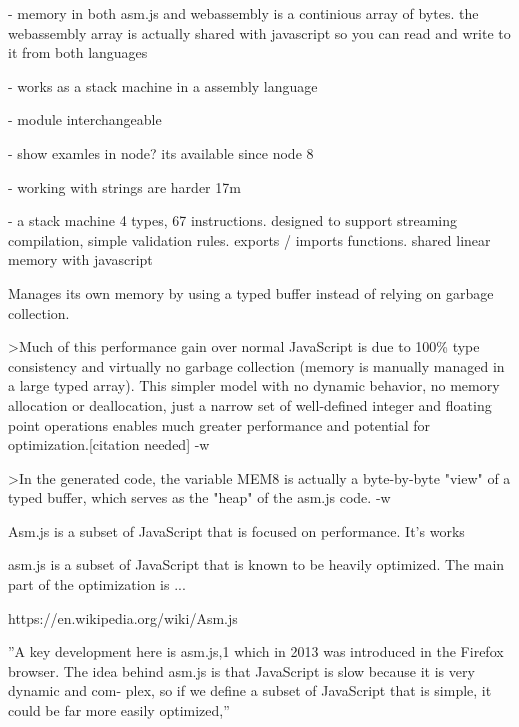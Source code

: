 - memory in both asm.js and webassembly is a continious array of bytes. the webassembly array is actually shared with javascript so you can read and write to it from both languages

- works as a stack machine in a assembly language

- module interchangeable

- show examles in node? its available since node 8

- working with strings are harder 17m


- a stack machine 4 types, 67 instructions. designed to support streaming compilation, simple validation rules. exports / imports functions. shared linear memory with javascript



Manages its own memory by using a typed buffer instead of relying on garbage collection.

>Much of this performance gain over normal JavaScript is due to 100\% type consistency and virtually no garbage collection (memory is manually managed in a large typed array). This simpler model with no dynamic behavior, no memory allocation or deallocation, just a narrow set of well-defined integer and floating point operations enables much greater performance and potential for optimization.[citation needed] -w

>In the generated code, the variable MEM8 is actually a byte-by-byte "view" of a typed buffer, which serves as the "heap" of the asm.js code. -w





Asm.js is a subset of JavaScript that is focused on performance. It's works 

asm.js is a subset of JavaScript that is known to be heavily optimized. The main part of the optimization is ...

https://en.wikipedia.org/wiki/Asm.js

''A key development here is asm.js,1 which in 2013 was introduced in the Firefox browser. The idea behind asm.js is that JavaScript is slow because it is very dynamic and com- plex, so if we define a subset of JavaScript that is simple, it could be far more easily optimized,'' \parencite{Zakai2018}



